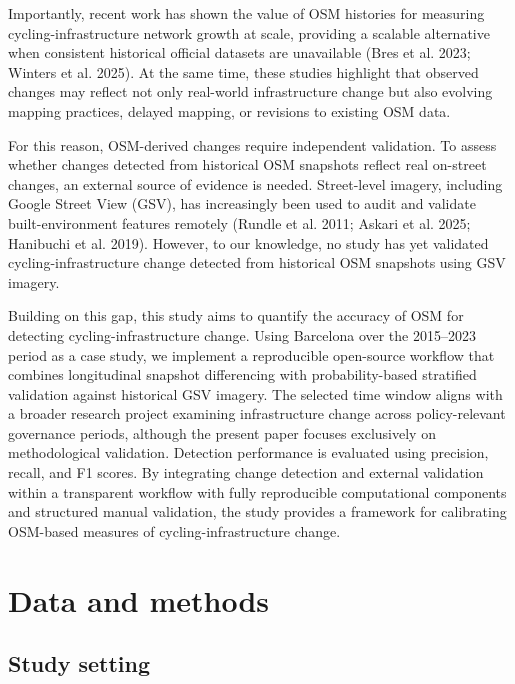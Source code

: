\documentclass[
]{article}
\begin{document}
Importantly, recent work has shown the value of OSM histories for
measuring cycling-infrastructure network growth at scale, providing a
scalable alternative when consistent historical \color{black}official
datasets \color{black} are unavailable (Bres et al. 2023; Winters et al.
2025). At the same time, these studies highlight that observed changes
may reflect not only real-world infrastructure change but also evolving
mapping practices, delayed mapping, or revisions to existing OSM data.

For this reason, OSM-derived changes require independent validation. To
assess whether changes detected from historical OSM snapshots reflect
real on-street changes, an external source of evidence is needed.
Street-level imagery, including Google Street View (GSV), has
increasingly been used to audit and validate built-environment features
remotely (Rundle et al. 2011; Askari et al. 2025; Hanibuchi et al.
2019). However, to our knowledge, no study has yet validated
cycling-infrastructure change detected from historical OSM snapshots
using GSV imagery.

\color{blue}Building on this gap, this study aims to quantify the
accuracy of OSM for detecting cycling-infrastructure change.
\color{black} Using Barcelona over the 2015--2023 period as a case
study, we implement a reproducible open-source workflow that combines
longitudinal snapshot differencing with probability-based stratified
validation against historical GSV imagery. The selected time window
aligns with a broader research project examining infrastructure change
across policy-relevant governance periods, although the present paper
focuses exclusively on methodological validation. Detection performance
is evaluated using precision, recall, and F1 scores. By integrating
change detection and external validation within a transparent
\color{blue}workflow with fully reproducible computational components
and structured manual validation, the study provides a \color{black}
framework for calibrating OSM-based measures of cycling-infrastructure
change.

\section{Data and methods}\label{data-and-methods}

\subsection{Study setting}\label{study-setting}
\end{document}
